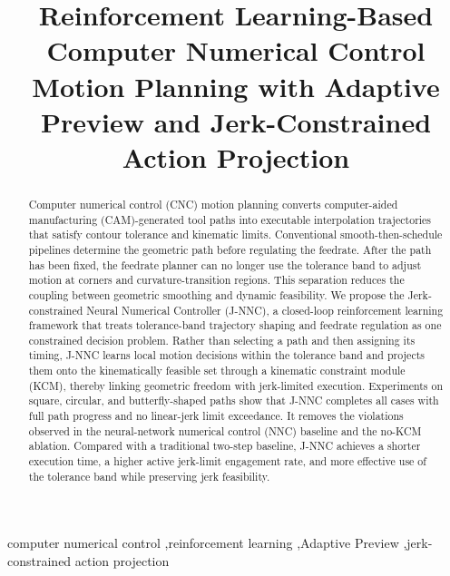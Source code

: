 \documentclass[preprint,12pt]{elsarticle}
\begin{document}
\begin{frontmatter}

\title{Reinforcement Learning-Based Computer Numerical Control Motion Planning with Adaptive Preview and Jerk-Constrained Action Projection}

\begin{abstract}
Computer numerical control (CNC) motion planning converts computer-aided manufacturing (CAM)-generated tool paths into executable interpolation trajectories that satisfy contour tolerance and kinematic limits. Conventional smooth-then-schedule pipelines determine the geometric path before regulating the feedrate. After the path has been fixed, the feedrate planner can no longer use the tolerance band to adjust motion at corners and curvature-transition regions. This separation reduces the coupling between geometric smoothing and dynamic feasibility. We propose the Jerk-constrained Neural Numerical Controller (J-NNC), a closed-loop reinforcement learning framework that treats tolerance-band trajectory shaping and feedrate regulation as one constrained decision problem. Rather than selecting a path and then assigning its timing, J-NNC learns local motion decisions within the tolerance band and projects them onto the kinematically feasible set through a kinematic constraint module (KCM), thereby linking geometric freedom with jerk-limited execution. Experiments on square, circular, and butterfly-shaped paths show that J-NNC completes all cases with full path progress and no linear-jerk limit exceedance. It removes the violations observed in the neural-network numerical control (NNC) baseline and the no-KCM ablation. Compared with a traditional two-step baseline, J-NNC achieves a shorter execution time, a higher active jerk-limit engagement rate, and more effective use of the tolerance band while preserving jerk feasibility.
\end{abstract}

\begin{keyword}
computer numerical control \sep reinforcement learning \sep Adaptive Preview \sep jerk-constrained action projection
\end{keyword}

\end{frontmatter}
\end{document}
